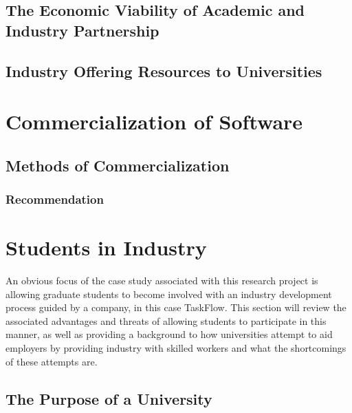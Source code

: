 \subsection{The Economic Viability of Academic and Industry Partnership}
\subsection{Industry Offering Resources to Universities}

\section{Commercialization of Software}
\subsection{Methods of Commercialization}
\subsubsection{Recommendation}

\section{Students in Industry}
\par{An obvious focus of the case study associated with this research project is allowing graduate students to become involved with an industry development process guided by a company, in this case TaskFlow. This section will review the associated advantages and threats of allowing students to participate in this manner, as well as providing a background to how universities attempt to aid employers by providing industry with skilled workers and what the shortcomings of these attempts are.}
\subsection{The Purpose of a University}
